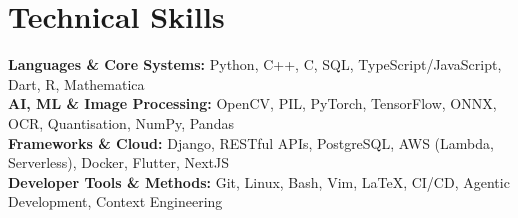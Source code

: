 \medskip

\resumeItemListStart
{}
\resumeItemListEnd
\resumeItemListEnd

\resumeSubHeadingListEnd

\section{Technical Skills}
\begin{itemize}[leftmargin=0.15in, label={}]
  \small{\item{
        \textbf{Languages \& Core Systems:} {Python, C++, C, SQL, TypeScript/JavaScript, Dart, R, Mathematica} \\
        \textbf{AI, ML \& Image Processing:} {OpenCV, PIL, PyTorch, TensorFlow, ONNX, OCR, Quantisation, NumPy, Pandas} \\
        \textbf{Frameworks \& Cloud:} {Django, RESTful APIs, PostgreSQL, AWS (Lambda, Serverless), Docker, Flutter, NextJS} \\
        \textbf{Developer Tools \& Methods:} {Git, Linux, Bash, Vim, \LaTeX\EndAccSupp{}, CI/CD, Agentic Development, Context Engineering} \\
        }}
\end{itemize}
